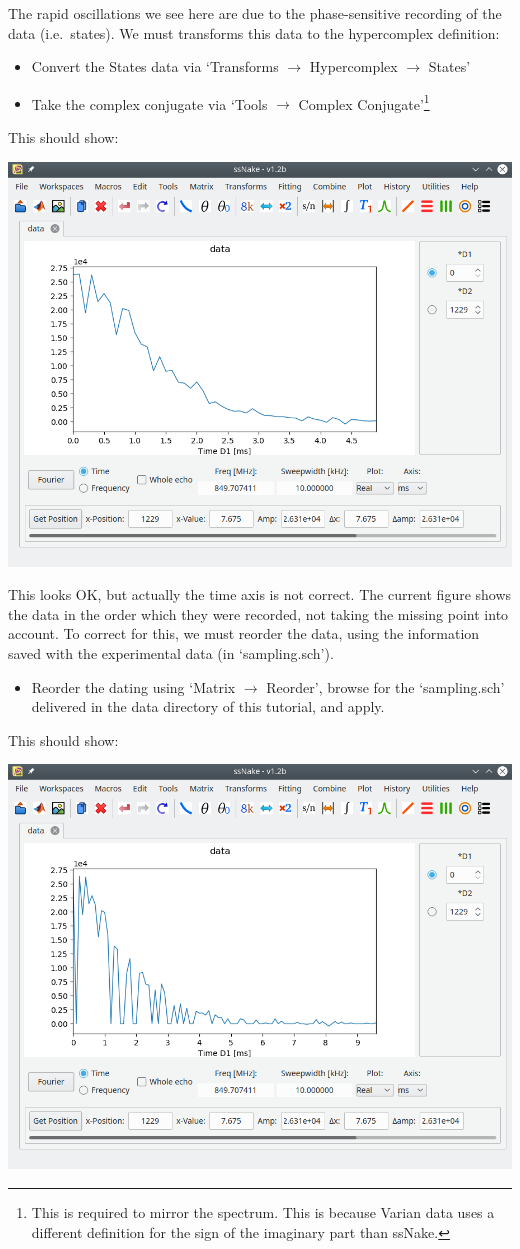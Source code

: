 \documentclass[11pt,a4paper]{article}
\begin{document}
The rapid oscillations we see here are due to the phase-sensitive recording of
the data (i.e.\ states). We must transforms this data to the hypercomplex
definition:
\begin{itemize}
  \item Convert the States data via `Transforms $\longrightarrow$ Hypercomplex
	 $\longrightarrow$ States'
  \item Take the complex conjugate via `Tools $\longrightarrow$ Complex
	 Conjugate'\footnote{This is required to mirror the spectrum. This is because
	 Varian data uses a different definition for the sign of the imaginary part
  than ssNake.}
\end{itemize}
This should show:
\begin{center}
\includegraphics[width=0.8\linewidth]{Figs/Fig2.png}
\end{center}
This looks OK, but actually the time axis is not correct. The current figure
shows the data in the order which they were recorded, not taking the missing
point into account. To correct for this, we must reorder the data, using the
information saved with the experimental data (in `sampling.sch').
\begin{itemize}
  \item Reorder the dating using `Matrix $\longrightarrow$ Reorder', browse for
	 the `sampling.sch' delivered in the data directory of this tutorial, and
	 apply.
\end{itemize}
This should show:
\begin{center}
\includegraphics[width=0.8\linewidth]{Figs/Fig3.png}
\end{center}
\end{document}
